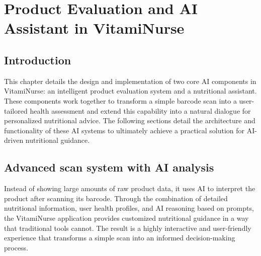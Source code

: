 

\chapter{Product Evaluation and AI Assistant in VitamiNurse}
\section*{Introduction}
This chapter details the design and implementation of two core AI components in VitamiNurse: an intelligent product evaluation system and a nutritional assistant.
These components work together to transform a simple barcode scan into a user-tailored health assessment and extend this capability into a natural dialogue for personalized nutritional advice. 
The following sections detail the architecture and functionality of these AI systems to ultimately achieve a practical solution for AI-driven nutritional guidance.

\section{Advanced scan system with AI analysis }

Instead of showing large amounts of raw product data, it uses AI to interpret the product after scanning its barcode.  Through the combination of detailed nutritional information, user health profiles, and AI reasoning based on prompts, the VitamiNurse application provides customized nutritional guidance in a way that traditional tools cannot. The result is a highly interactive and user-friendly experience that transforms a simple scan into an informed decision-making process.

